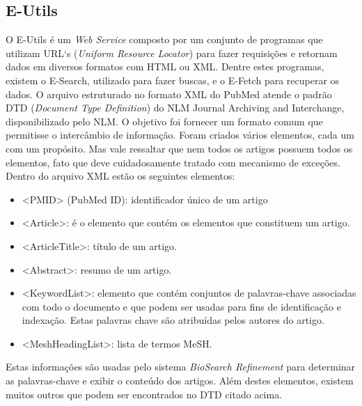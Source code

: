 \subsection{E-Utils}
O E-Utils é um \emph{Web Service} composto por um conjunto de programas que utilizam URL`s (\emph{Uniform Resource Locator}) para fazer requisições e retornam dados em diversos formatos com HTML ou XML. Dentre estes programas, existem o E-Search, utilizado para fazer buscas, e o E-Fetch para recuperar os dados. O arquivo estruturado no formato XML do PubMed atende o padrão DTD (\emph{Document Type Definition}) do NLM Journal Archiving and Interchange, disponibilizado pelo NLM. O objetivo foi fornecer um formato comum que permitisse o intercâmbio de informação. Foram criados vários elementos, cada um com um propósito. Mas vale ressaltar que nem todos os artigos possuem todos os elementos, fato que deve cuidadosamente tratado com mecanismo de exceções. Dentro do arquivo XML estão os seguintes elementos:

\begin{itemize}
    \item <PMID> (PubMed ID): identificador único de um artigo
    \item <Article>:  é o elemento que contém os elementos que constituem um artigo.
    \item <ArticleTitle>:  título de um artigo.
    \item <Abstract>:  resumo de um artigo.
    \item <KeywordList>:  elemento que contém conjuntos de palavras-chave associadas com todo o documento e que podem ser usadas para fins de identificação e indexação. Estas palavras chave são atribuídas pelos autores do artigo.
    \item <MeshHeadingList>: lista de termos MeSH.
\end{itemize}
Estas informações são usadas pelo sistema \emph{BioSearch Refinement} para determinar as palavras-chave e exibir o conteúdo dos artigos. Além destes elementos, existem muitos outros que podem ser encontrados no DTD citado acima.

